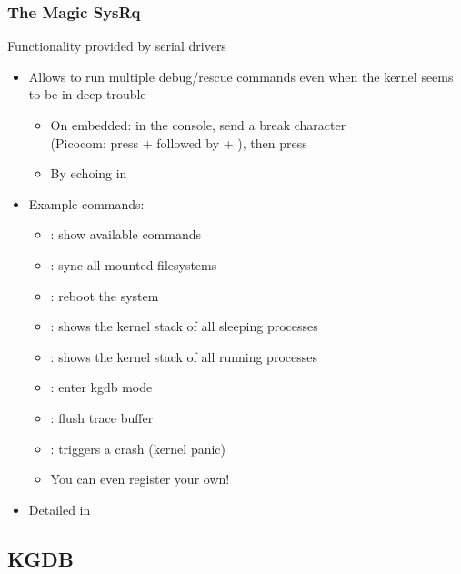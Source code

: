 \begin{frame}[fragile]
  \frametitle{The Magic SysRq}
  Functionality provided by serial drivers
  \begin{itemize}
  \item Allows to run multiple debug/rescue commands even when the
    kernel seems to be in deep trouble
    \begin{itemize}
      \item On embedded: in the console, send a break character\\
        (Picocom: press \code{[Ctrl]} +  followed by \code{[Ctrl]}
        + \code{\ }), then press 
       \item By echoing  in 
    \end{itemize}
  \item Example commands:
    \begin{itemize}
    \item {}: show available commands
    \item {}: sync all mounted filesystems
    \item {}: reboot the system
    \item {}: shows the kernel stack of all sleeping processes
    \item {}: shows the kernel stack of all running processes
    \item {}: enter kgdb mode
    \item {}: flush trace buffer
    \item {}: triggers a crash (kernel panic)
    \item You can even register your own!
    \end{itemize}
  \item Detailed in 
  \end{itemize}
\end{frame}

\subsection{KGDB}



